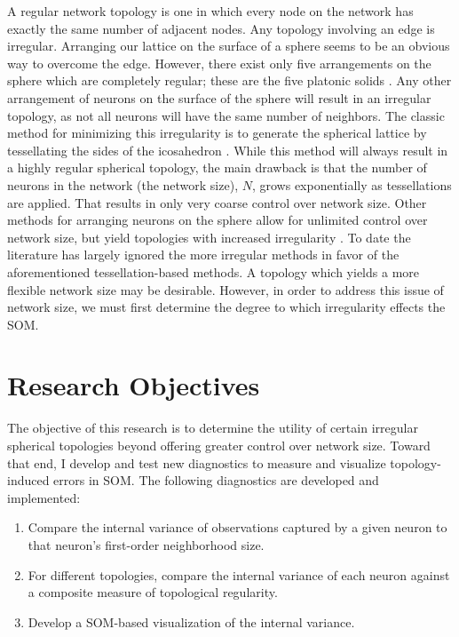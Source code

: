 A regular network topology is one in which every node on the network has exactly the
same number of adjacent nodes.  Any topology involving an edge is irregular.
Arranging our lattice on the surface of a sphere seems to be an obvious
way to overcome the edge.  However, there exist only five arrangements on the
sphere which are completely regular; these are the five platonic solids \citep{ritter99,
harris2000}.  Any other arrangement of neurons on the surface of the sphere will
result in an irregular topology, as not all neurons will have the same number of
neighbors.  The classic method for minimizing this irregularity is to generate
the spherical lattice by tessellating the sides of the icosahedron
\citep{Nishio:2006fk}.  While this method will always result in a highly
regular spherical topology, the main drawback is that the number of neurons in
the network (the network size), \(N\), grows exponentially as tessellations are
applied. That results in only very coarse control over network size.
 Other methods for arranging neurons on the sphere allow
for unlimited control over network size, but yield topologies with increased
irregularity \citep{harris2000, wu2005, Nishio:2006fk}.  To date the
literature has largely ignored the more irregular methods in favor of the
aforementioned tessellation-based methods.  A topology which yields a more flexible network
size may be desirable.  However, in order to address this issue of network
size, we must first determine the degree to which irregularity effects the
SOM.

\section{Research Objectives}
The objective of this research is to determine the utility of certain irregular
spherical topologies beyond offering greater control over network size.  Toward
that end, I develop and test new diagnostics to measure and visualize
topology-induced errors in SOM.  The following diagnostics are developed and
implemented:

\begin{enumerate}
    	\item Compare the internal variance of observations captured by a given neuron to that neuron's first-order neighborhood size.
	\item For different topologies, compare the internal variance of each neuron against a composite measure of topological regularity.
	\item Develop a SOM-based visualization of the internal variance.
\end{enumerate}

